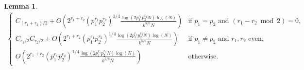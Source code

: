 \documentclass[11pt, reqno]{amsart}
\newtheorem{lemma}[theorem]{Lemma}
\theoremstyle{definition}
\theoremstyle{remark}
\numberwithin{equation}{section}
\begin{document}
\begin{lemma}
\begin{align*}
\begin{cases}
  C_{(r_1+r_2)/2} 
    + O\!\left(2^{r_1+r_2}(p_1^{r_1}p_2^{r_2})^{1/4}
    \frac{\log(2p_1^{r_1}p_2^{r_2}N)\log(N)}{k^{5/6}N}\right) 
    & \text{if $p_1 = p_2$ and $(r_1-r_2 \bmod 2)=0$}, \\[6pt]
  C_{r_1/2}C_{r_2/2} 
    + O\!\left(2^{r_1+r_2}(p_1^{r_1}p_2^{r_2})^{1/4}
    \frac{\log(2p_1^{r_1}p_2^{r_2}N)\log(N)}{k^{5/6}N}\right) 
    & \text{if $p_1 \neq p_2$ and $r_1,r_2$ even}, \\[6pt]
  O\!\left(2^{r_1+r_2}(p_1^{r_1}p_2^{r_2})^{1/4}
    \frac{\log(2p_1^{r_1}p_2^{r_2}N)\log(N)}{k^{5/6}N}\right) 
    & \text{otherwise}.
\end{cases}
\end{align*}\normalsize
\end{lemma}

\end{document}
